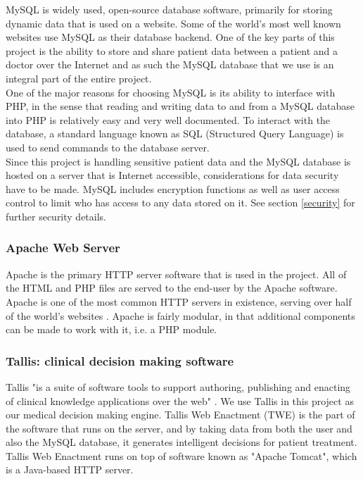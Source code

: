 \documentclass[11pt]{article}
\begin{document}
MySQL is widely used, open-source database software, primarily for storing dynamic data that is used on a website. Some of the world's most well known websites use MySQL as their database backend. One of the key parts of this project is the ability to store and share patient data between a patient and a doctor over the Internet and as such the MySQL database that we use is an integral part of the entire project. 
\\ \indent
One of the major reasons for choosing MySQL is its ability to interface with PHP, in the sense that reading and writing data to and from a MySQL database into PHP is relatively easy and very well documented. To interact with the database, a standard language known as SQL (Structured Query Language) is used to send commands to the database server.
\\ \indent
Since this project is handling sensitive patient data and the MySQL database is hosted on a server that is Internet accessible, considerations for data security have to be made. MySQL includes encryption functions as well as user access control to limit who has access to any data stored on it. See section \ref{security} for further security details.

\subsubsection{Apache Web Server}
Apache is the primary HTTP server software that is used in the project. All of the HTML and PHP files are served to the end-user by the Apache software. Apache is one of the most common HTTP servers in existence, serving over half of the world's websites \cite{netcraft:apache}. Apache is fairly modular, in that additional components can be made to work with it, i.e. a PHP module.

\subsubsection{Tallis: clinical decision making software}

Tallis "is a suite of software tools to support authoring, publishing and enacting of clinical knowledge applications over the web" \cite{tallisDescription}. We use Tallis in this project as our medical decision making engine. Tallis Web Enactment (TWE) is the part of the software that runs on the server, and by taking data from both the user and also the MySQL database, it generates intelligent decisions for patient treatment. Tallis Web Enactment runs on top of software known as "Apache Tomcat", which is a Java-based HTTP server.
\end{document}
